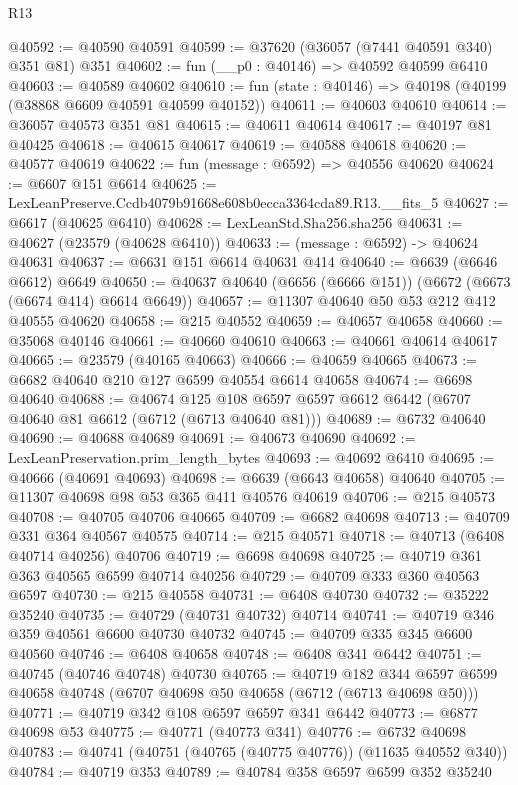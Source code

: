 \begin{lexlean}{R13}
\begin{coremodule}
@40592 := @40590 @40591
@40599 := @37620 (@36057 (@7441 @40591 @340) @351 @81) @351
@40602 := fun (__p0 : @40146) => @40592 @40599 @6410
@40603 := @40589 @40602
@40610 := fun (state : @40146) => @40198 (@40199 (@38868 @6609 @40591 @40599 @40152))
@40611 := @40603 @40610
@40614 := @36057 @40573 @351 @81
@40615 := @40611 @40614
@40617 := @40197 @81 @40425
@40618 := @40615 @40617
@40619 := @40588 @40618
@40620 := @40577 @40619
@40622 := fun (message : @6592) => @40556 @40620
@40624 := @6607 @151 @6614
@40625 := LexLeanPreserve.Ccdb4079b91668e608b0ecca3364cda89.R13.__fits_5
@40627 := @6617 (@40625 @6410)
@40628 := LexLeanStd.Sha256.sha256
@40631 := @40627 (@23579 (@40628 @6410))
@40633 := (message : @6592) -> @40624 @40631
@40637 := @6631 @151 @6614 @40631 @414
@40640 := @6639 (@6646 @6612) @6649
@40650 := @40637 @40640 (@6656 (@6666 @151)) (@6672 (@6673 (@6674 @414) @6614 @6649))
@40657 := @11307 @40640 @50 @53 @212 @412 @40555 @40620
@40658 := @215 @40552
@40659 := @40657 @40658
@40660 := @35068 @40146
@40661 := @40660 @40610
@40663 := @40661 @40614 @40617
@40665 := @23579 (@40165 @40663)
@40666 := @40659 @40665
@40673 := @6682 @40640 @210 @127 @6599 @40554 @6614 @40658
@40674 := @6698 @40640
@40688 := @40674
    @125
    @108
    @6597
    @6597
    @6612
    @6442
    (@6707 @40640 @81 @6612 (@6712 (@6713 @40640 @81)))
@40689 := @6732 @40640
@40690 := @40688 @40689
@40691 := @40673 @40690
@40692 := LexLeanPreservation.prim_length_bytes
@40693 := @40692 @6410
@40695 := @40666 (@40691 @40693)
@40698 := @6639 (@6643 @40658) @40640
@40705 := @11307 @40698 @98 @53 @365 @411 @40576 @40619
@40706 := @215 @40573
@40708 := @40705 @40706 @40665
@40709 := @6682 @40698
@40713 := @40709 @331 @364 @40567 @40575
@40714 := @215 @40571
@40718 := @40713 (@6408 @40714 @40256) @40706
@40719 := @6698 @40698
@40725 := @40719 @361 @363 @40565 @6599 @40714 @40256
@40729 := @40709 @333 @360 @40563 @6597
@40730 := @215 @40558
@40731 := @6408 @40730
@40732 := @35222 @35240
@40735 := @40729 (@40731 @40732) @40714
@40741 := @40719 @346 @359 @40561 @6600 @40730 @40732
@40745 := @40709 @335 @345 @6600 @40560
@40746 := @6408 @40658
@40748 := @6408 @341 @6442
@40751 := @40745 (@40746 @40748) @40730
@40765 := @40719
    @182
    @344
    @6597
    @6599
    @40658
    @40748
    (@6707 @40698 @50 @40658 (@6712 (@6713 @40698 @50)))
@40771 := @40719 @342 @108 @6597 @6597 @341 @6442
@40773 := @6877 @40698 @53
@40775 := @40771 (@40773 @341)
@40776 := @6732 @40698
@40783 := @40741 (@40751 (@40765 (@40775 @40776)) (@11635 @40552 @340))
@40784 := @40719 @353
@40789 := @40784 @358 @6597 @6599 @352 @35240

\end{coremodule}
\end{lexlean}
